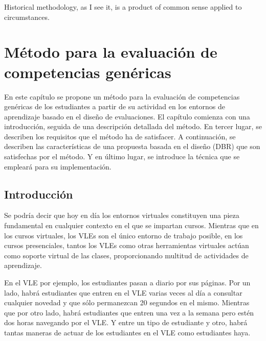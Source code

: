 

\begin{savequote}[50mm]
Historical methodology, as I see it, is a product of common sense applied to circumstances. 
\end{savequote}


\chapter{Método para la evaluación de competencias genéricas}
\label{cha:Overall methodology}

\ifpdf
    \graphicspath{{4_overall_methodology/figures/PNG/}{4_overall_methodology/figures/PDF/}{4_overall_methodology/figures/}}
\else
    \graphicspath{{4_overall_methodology/figures/EPS/}{4_overall_methodology/figures/}}
\fi


En este capítulo se propone un método para la evaluación de competencias genéricas de los estudiantes a partir de su actividad en los entornos de aprendizaje basado en el diseño de evaluaciones. El capítulo comienza con una introducción, seguida de una descripción detallada del método. En tercer lugar, se describen los requisitos que el método ha de satisfacer. A continuación, se describen las características de una propuesta basada en el diseño (DBR) que son satisfechas por el método. Y en último lugar, se introduce la técnica que se empleará para su implementación.

\section{Introducción}

Se podría decir que hoy en día los entornos virtuales constituyen una pieza fundamental en cualquier contexto en el que se impartan cursos. Mientras que en los cursos virtuales, los VLEs son el único entorno de trabajo posible, en los cursos presenciales, tantos los VLEs como otras herramientas virtuales actúan como soporte virtual de las clases, proporcionando multitud de actividades de aprendizaje. 

En el VLE por ejemplo, los estudiantes pasan a diario por sus páginas. Por un lado, habrá estudiantes que entren en el VLE varias veces al día a consultar cualquier novedad y que sólo permanezcan 20 segundos en el mismo. Mientras que por otro lado, habrá estudiantes que entren una vez a la semana pero estén dos horas navegando por el VLE. Y entre un tipo de estudiante y otro, habrá tantas maneras de actuar de los estudiantes en el VLE como estudiantes haya. 

